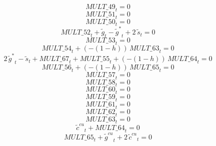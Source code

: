 \begin{dmath}
{MULT\_49}_{t}=0
\end{dmath}
\begin{dmath}
{MULT\_51}_{t}=0
\end{dmath}
\begin{dmath}
{MULT\_50}_{t}=0
\end{dmath}
\begin{dmath}
{MULT\_52}_{t}+{{\tilde g}}_{t}-{{\tilde g^*}}_{t}+2\, {{\tilde s}}_{t}=0
\end{dmath}
\begin{dmath}
{MULT\_53}_{t}=0
\end{dmath}
\begin{dmath}
{MULT\_54}_{t}+\left(-\left(1-{{h}}\right)\right)\, {MULT\_63}_{t}=0
\end{dmath}
\begin{dmath}
2\, {{\tilde g^*}}_{t}-{{\tilde s}}_{t}+{MULT\_67}_{t}+{MULT\_55}_{t}+\left(-\left(1-{{h}}\right)\right)\, {MULT\_64}_{t}=0
\end{dmath}
\begin{dmath}
{MULT\_56}_{t}+\left(-\left(1-{{h}}\right)\right)\, {MULT\_65}_{t}=0
\end{dmath}
\begin{dmath}
{MULT\_57}_{t}=0
\end{dmath}
\begin{dmath}
{MULT\_58}_{t}=0
\end{dmath}
\begin{dmath}
{MULT\_60}_{t}=0
\end{dmath}
\begin{dmath}
{MULT\_59}_{t}=0
\end{dmath}
\begin{dmath}
{MULT\_61}_{t}=0
\end{dmath}
\begin{dmath}
{MULT\_62}_{t}=0
\end{dmath}
\begin{dmath}
{MULT\_63}_{t}=0
\end{dmath}
\begin{dmath}
{{\tilde c^{cu}}}_{t}+{MULT\_64}_{t}=0
\end{dmath}
\begin{dmath}
{MULT\_65}_{t}+{{\tilde g^{cu}}}_{t}+2\, {{\tilde c^{cu}}}_{t}=0
\end{dmath}
